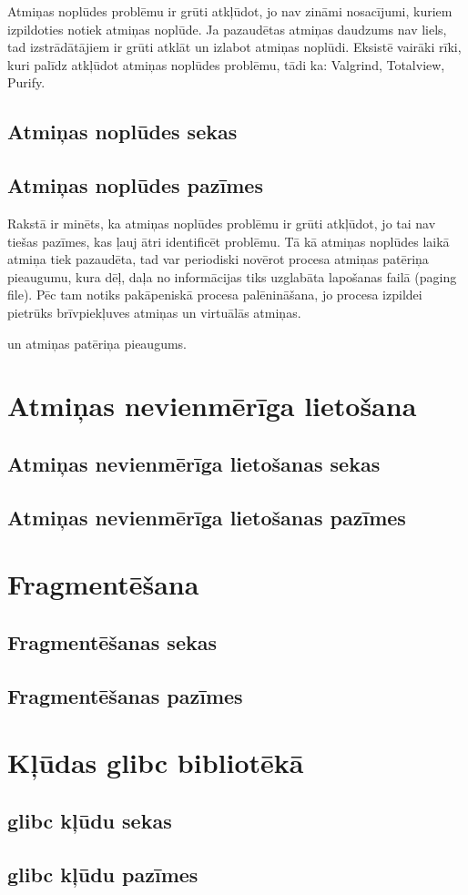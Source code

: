 Atmiņas noplūdes problēmu ir grūti atkļūdot,  jo nav zināmi nosacījumi, kuriem izpildoties notiek atmiņas noplūde. 
Ja pazaudētas atmiņas daudzums nav liels, tad izstrādātājiem ir grūti atklāt un izlabot atmiņas noplūdi. 
Eksistē vairāki rīki, kuri palīdz atkļūdot atmiņas noplūdes problēmu, tādi ka: Valgrind, Totalview, Purify.
\subsection{Atmiņas noplūdes sekas}





\subsection{Atmiņas noplūdes pazīmes}

Rakstā \cite{RHBJ} ir minēts, ka atmiņas noplūdes problēmu ir grūti atkļūdot, jo tai nav tiešas pazīmes, kas ļauj ātri identificēt problēmu.
Tā kā atmiņas noplūdes laikā atmiņa tiek pazaudēta, tad var periodiski novērot procesa atmiņas patēriņa pieaugumu, kura dēļ, daļa no informācijas tiks uzglabāta lapošanas failā (paging file).
Pēc tam notiks pakāpeniskā procesa palēnināšana, jo procesa izpildei pietrūks brīvpiekļuves atmiņas un virtuālās atmiņas.

 un atmiņas patēriņa pieaugums. 




\section{Atmiņas nevienmērīga lietošana}
\subsection{Atmiņas nevienmērīga lietošanas sekas}
\subsection{Atmiņas nevienmērīga lietošanas pazīmes}

\section{Fragmentēšana}
\subsection{Fragmentēšanas sekas}
\subsection{Fragmentēšanas pazīmes}

\section{Kļūdas glibc bibliotēkā}
\subsection{glibc kļūdu sekas}
\subsection{glibc kļūdu pazīmes}
